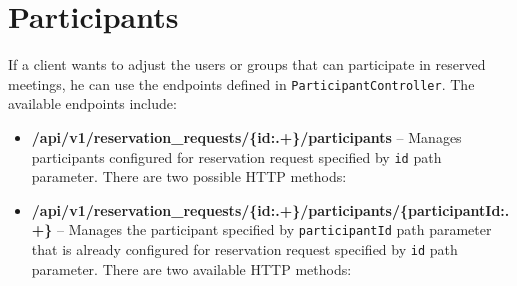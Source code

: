 \section{Participants}
If a client wants to adjust the users or groups that can participate in reserved meetings, he can use the endpoints defined in  \texttt{Participant\-Controller}.
The available endpoints include:
\begin{itemize}
    \item \textbf{/api/v1/reservation\_requests/\{id:.+\}/participants} -- Manages participants configured for reservation request specified by \texttt{id} path parameter. There are two possible HTTP methods:
    \item \textbf{/api/v1/reservation\_requests/\{id:.+\}/participants/\{participantId:.+\}} -- Manages the participant specified by \texttt{participantId} path parameter that is already configured for reservation request specified by \texttt{id} path parameter. There are two available HTTP methods:
\end{itemize}
